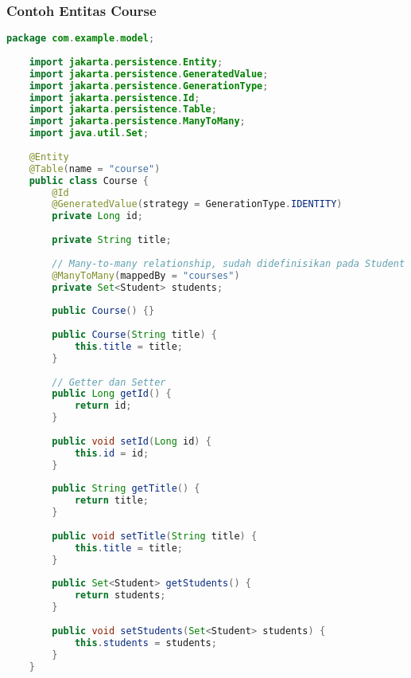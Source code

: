 \subsubsection*{Contoh Entitas Course}
\begin{lstlisting}[language=Java, style=JavaStyle]
	package com.example.model;
	
	import jakarta.persistence.Entity;
	import jakarta.persistence.GeneratedValue;
	import jakarta.persistence.GenerationType;
	import jakarta.persistence.Id;
	import jakarta.persistence.Table;
	import jakarta.persistence.ManyToMany;
	import java.util.Set;
	
	@Entity
	@Table(name = "course")
	public class Course {
		@Id
		@GeneratedValue(strategy = GenerationType.IDENTITY)
		private Long id;
		
		private String title;
		
		// Many-to-many relationship, sudah didefinisikan pada Student
		@ManyToMany(mappedBy = "courses")
		private Set<Student> students;
		
		public Course() {}
		
		public Course(String title) {
			this.title = title;
		}
		
		// Getter dan Setter
		public Long getId() {
			return id;
		}
		
		public void setId(Long id) {
			this.id = id;
		}
		
		public String getTitle() {
			return title;
		}
		
		public void setTitle(String title) {
			this.title = title;
		}
		
		public Set<Student> getStudents() {
			return students;
		}
		
		public void setStudents(Set<Student> students) {
			this.students = students;
		}
	}
\end{lstlisting}

